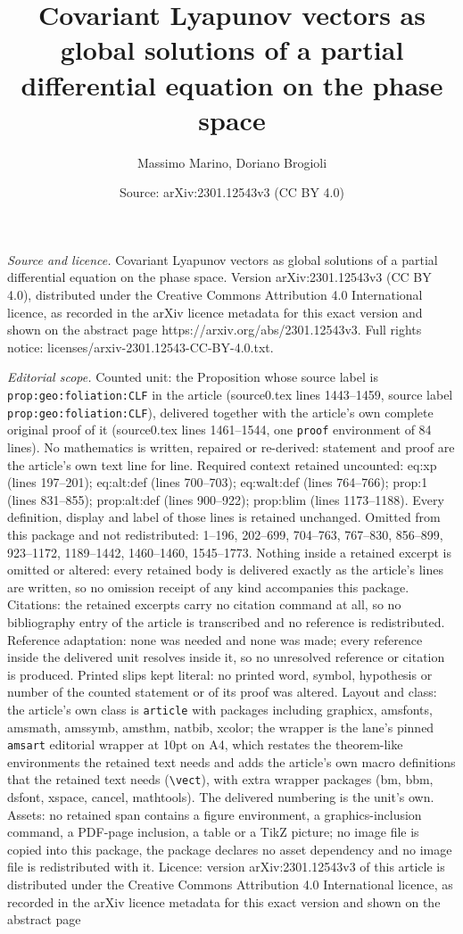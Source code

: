 \documentclass[10pt,a4paper]{amsart}
\title[Covariant Lyapunov vectors as global solutions of a partial ]{Covariant Lyapunov vectors as global solutions of a partial differential equation on the phase space}
\author{Massimo Marino, Doriano Brogioli}
\date{Source: arXiv:2301.12543v3 (CC BY 4.0)}
\begin{document}
\maketitle

\noindent\emph{Source and licence.} Covariant Lyapunov vectors as global solutions of a partial differential equation on the phase space. Version arXiv:2301.12543v3 (CC BY 4.0), distributed under the Creative Commons Attribution 4.0 International licence, as recorded in the arXiv licence metadata for this exact version and shown on the abstract page https://arxiv.org/abs/2301.12543v3. Full rights notice: licenses/arxiv-2301.12543-CC-BY-4.0.txt.\par\smallskip

\noindent\textit{Editorial scope.} Counted unit: the Proposition whose source label is \texttt{prop:geo:foliation:CLF} in the article (source0.tex lines 1443--1459, source label \texttt{prop:geo:foliation:CLF}), delivered together with the article's own complete original proof of it (source0.tex lines 1461--1544, one \texttt{proof} environment of 84 lines). No mathematics is written, repaired or re-derived: statement and proof are the article's own text line for line. Required context retained uncounted: eq:xp (lines 197--201); eq:alt:def (lines 700--703); eq:walt:def (lines 764--766); prop:1 (lines 831--855); prop:alt:def (lines 900--922); prop:blim (lines 1173--1188). Every definition, display and label of those lines is retained unchanged. Omitted from this package and not redistributed: 1--196, 202--699, 704--763, 767--830, 856--899, 923--1172, 1189--1442, 1460--1460, 1545--1773. Nothing inside a retained excerpt is omitted or altered: every retained body is delivered exactly as the article's lines are written, so no omission receipt of any kind accompanies this package. Citations: the retained excerpts carry no citation command at all, so no bibliography entry of the article is transcribed and no reference is redistributed. Reference adaptation: none was needed and none was made; every reference inside the delivered unit resolves inside it, so no unresolved reference or citation is produced. Printed slips kept literal: no printed word, symbol, hypothesis or number of the counted statement or of its proof was altered. Layout and class: the article's own class is \texttt{article} with packages including graphicx, amsfonts, amsmath, amssymb, amsthm, natbib, xcolor; the wrapper is the lane's pinned \texttt{amsart} editorial wrapper at 10pt on A4, which restates the theorem-like environments the retained text needs and adds the article's own macro definitions that the retained text needs (\texttt{\textbackslash vect}), with extra wrapper packages (bm, bbm, dsfont, xspace, cancel, mathtools). The delivered numbering is the unit's own. Assets: no retained span contains a figure environment, a graphics-inclusion command, a PDF-page inclusion, a table or a TikZ picture; no image file is copied into this package, the package declares no asset dependency and no image file is redistributed with it. Licence: version arXiv:2301.12543v3 of this article is distributed under the Creative Commons Attribution 4.0 International licence, as recorded in the arXiv licence metadata for this exact version and shown on the abstract page 
\end{document}
